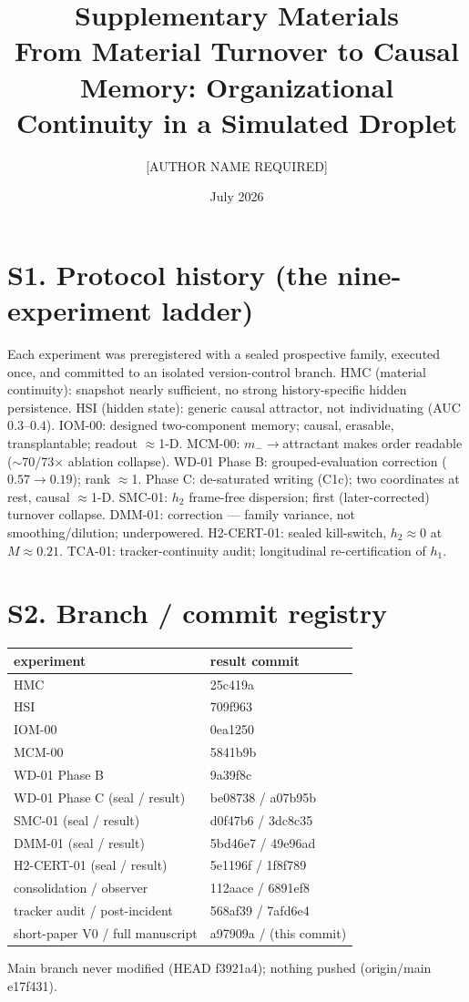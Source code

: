 \documentclass[11pt]{article}
\title{\textbf{Supplementary Materials}\\ \large From Material Turnover to Causal Memory: Organizational Continuity in a Simulated Droplet}
\author{[AUTHOR NAME REQUIRED]}
\date{July 2026}
\begin{document}
\maketitle

\section{S1. Protocol history (the nine-experiment ladder)}
Each experiment was preregistered with a sealed prospective family, executed once, and committed to an isolated
version-control branch. HMC (material continuity): snapshot nearly sufficient, no strong history-specific hidden
persistence. HSI (hidden state): generic causal attractor, not individuating (AUC $0.3$--$0.4$). IOM-00: designed
two-component memory; causal, erasable, transplantable; readout $\approx$1-D. MCM-00: $m_-\!\to$attractant makes
order readable ($\sim$70/73$\times$ ablation collapse). WD-01 Phase B: grouped-evaluation correction
($0.57\to0.19$); rank $\approx$1. Phase C: de-saturated writing (C1c); two coordinates at rest, causal $\approx$1-D.
SMC-01: $h_2$ frame-free dispersion; first (later-corrected) turnover collapse. DMM-01: correction --- family
variance, not smoothing/dilution; underpowered. H2-CERT-01: sealed kill-switch, $h_2\approx0$ at $M\approx0.21$.
TCA-01: tracker-continuity audit; longitudinal re-certification of $h_1$.

\section{S2. Branch / commit registry}
\begin{longtable}{@{}ll@{}}\toprule experiment & result commit\\\midrule
HMC & 25c419a\\ HSI & 709f963\\ IOM-00 & 0ea1250\\ MCM-00 & 5841b9b\\ WD-01 Phase B & 9a39f8c\\
WD-01 Phase C (seal / result) & be08738 / a07b95b\\ SMC-01 (seal / result) & d0f47b6 / 3dc8c35\\
DMM-01 (seal / result) & 5bd46e7 / 49e96ad\\ H2-CERT-01 (seal / result) & 5e1196f / 1f8f789\\
consolidation / observer & 112aace / 6891ef8\\ tracker audit / post-incident & 568af39 / 7afd6e4\\
short-paper V0 / full manuscript & a97909a / (this commit)\\\bottomrule\end{longtable}
Main branch never modified (HEAD f3921a4); nothing pushed (origin/main e17f431).
\end{document}
